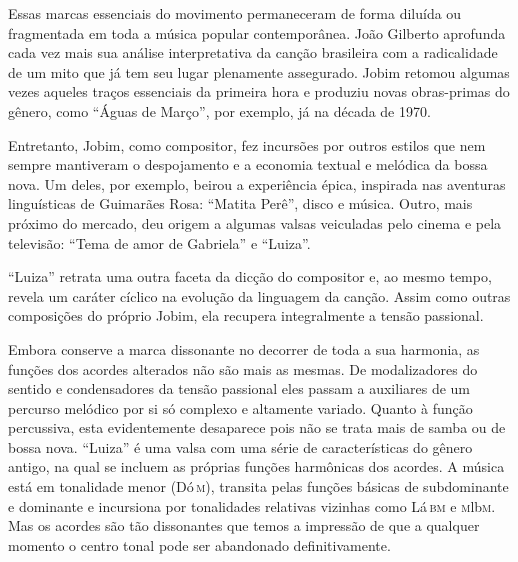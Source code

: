 Essas marcas essenciais do movimento permaneceram de forma diluída ou
fragmentada em toda a música popular contemporânea. João Gilberto
aprofunda cada vez mais sua análise interpretativa da canção brasileira
com a radicalidade de um mito que já tem seu lugar plenamente
assegurado. Jobim retomou algumas vezes aqueles traços essenciais da
primeira hora e produziu novas obras-primas do gênero, como ``Águas de
Março'', por exemplo, já na década de 1970.

Entretanto, Jobim, como compositor, fez incursões por outros estilos que
nem sempre mantiveram o despojamento e a economia textual e melódica da
bossa nova. Um deles, por exemplo, beirou a experiência épica, inspirada
nas aventuras linguísticas de Guimarães Rosa: ``Matita Perê'', disco e
música. Outro, mais próximo do mercado, deu origem a algumas valsas
veiculadas pelo cinema e pela televisão: ``Tema de amor de Gabriela'' e
``Luiza''.











``Luiza'' retrata uma outra faceta da dicção do compositor e, ao mesmo
tempo, revela um caráter cíclico na evolução da linguagem da canção.
Assim como outras composições do próprio Jobim, ela recupera
integralmente a tensão passional.

Embora conserve a marca dissonante no decorrer de toda a sua harmonia,
as funções dos acordes alterados não são mais as mesmas. De
modalizadores do sentido e condensadores da tensão passional eles passam
a auxiliares de um percurso melódico por si só complexo e altamente
variado. Quanto à função percussiva, esta evidentemente desaparece pois
não se trata mais de samba ou de bossa nova. ``Luiza'' é uma valsa com uma
série de características do gênero antigo, na qual se incluem as
próprias funções harmônicas dos acordes. A música está em tonalidade
menor (Dó\,\textsc{m}), transita pelas funções básicas de subdominante e dominante
e incursiona por tonalidades relativas vizinhas como Lá\,\textsc{bm} e \textsc{m}lb\textsc{m}. Mas os
acordes são tão dissonantes que temos a impressão de que a qualquer
momento o centro tonal pode ser abandonado definitivamente.

